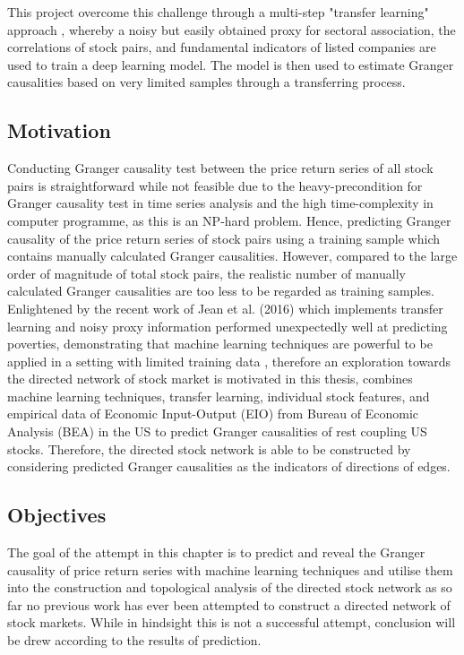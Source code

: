 This project overcome this challenge through a multi-step "transfer learning" approach \cite{pan2010survey}, whereby a noisy but easily obtained proxy for sectoral association, the correlations of stock pairs, and fundamental indicators of listed companies are used to train a deep learning model. The model is then used to estimate Granger causalities based on very limited samples through a transferring process.

\subsection{Motivation} %
Conducting Granger causality test between the price return series of all stock pairs is straightforward while not feasible due to the heavy-precondition for Granger causality test in time series analysis and the high time-complexity in computer programme, as this is an NP-hard problem. Hence, predicting Granger causality of the price return series of stock pairs using a training sample which contains manually calculated Granger causalities. However, compared to the large order of magnitude of total stock pairs, the realistic number of manually calculated Granger causalities are too less to be regarded as training samples. Enlightened by the recent work of Jean et al. (2016) which implements transfer learning and noisy proxy information performed unexpectedly well at predicting poverties, demonstrating that machine learning techniques are powerful to be applied in a setting with limited training data \cite{jean2016combining}, therefore an exploration towards the directed network of stock market is motivated in this thesis, combines machine learning techniques, transfer learning, individual stock features, and empirical data of Economic Input-Output (EIO) from Bureau of Economic Analysis (BEA) in the US to predict Granger causalities of rest coupling US stocks. Therefore, the directed stock network is able to be constructed by considering predicted Granger causalities as the indicators of directions of edges.

\subsection{Objectives} %
The goal of the attempt in this chapter is to predict and reveal the Granger causality of price return series with machine learning techniques and utilise them into the construction and topological analysis of the directed stock network as so far no previous work has ever been attempted to construct a directed network of stock markets. While in hindsight this is not a successful attempt, conclusion will be drew according to the results of prediction.

